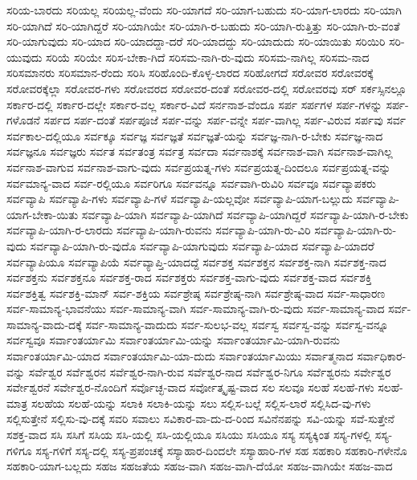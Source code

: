 {ಸರಿಯ-ಬಾರದು
ಸರಿಯಲ್ಲ
ಸರಿಯಲ್ಲ-ವೆಂದು
ಸರಿ-ಯಾಗದೆ
ಸರಿ-ಯಾಗ-ಬಹುದು
ಸರಿ-ಯಾಗ-ಲಾರದು
ಸರಿ-ಯಾಗಿ
ಸರಿ-ಯಾಗಿದೆ
ಸರಿ-ಯಾಗಿದ್ದರೆ
ಸರಿ-ಯಾಗಿಯೇ
ಸರಿ-ಯಾಗಿ-ರ-ಬಹುದು
ಸರಿ-ಯಾಗಿ-ರುತ್ತಿತ್ತು
ಸರಿ-ಯಾಗಿ-ರು-ವಂತೆ
ಸರಿ-ಯಾಗುವುದು
ಸರಿ-ಯಾದ
ಸರಿ-ಯಾದದ್ದಾ-ದರೆ
ಸರಿ-ಯಾದದ್ದು
ಸರಿ-ಯಾದುದು
ಸರಿ-ಯಾಯಿತು
ಸರಿಯಿರಿ
ಸರಿ-ಯುವುದು
ಸರಿಯೆ
ಸರಿಯೇ
ಸರಿಸ-ಬೇಕಾ-ಗಿದೆ
ಸರಿಸಮ-ನಾಗಿ-ರು-ವುದು
ಸರಿಸಮ-ನಾಗಿಲ್ಲ
ಸರಿಸಮ-ನಾದ
ಸರಿಸಮಾನರು
ಸರಿಸಮಾನ-ರೆಂದು
ಸರಿಸಿ
ಸರಿಹೊಂದಿ-ಕೊಳ್ಳ-ಲಾರದ
ಸರಿಹೋಗದೆ
ಸರೋವರ
ಸರೋವರಕ್ಕೆ
ಸರೋವರಕ್ಕೆಲ್ಲಾ
ಸರೋವರ-ಗಳು
ಸರೋವರದ
ಸರೋವರ-ದಂತೆ
ಸರೋವರ-ದಲ್ಲಿ
ಸರೋವರವು
ಸರ್
ಸರ್ಕಸ್ಸಿನಲ್ಲೂ
ಸರ್ಕಾರ-ದಲ್ಲಿ
ಸರ್ಕಾರ-ದಲ್ಲೇ
ಸರ್ಕಾರ-ವಲ್ಲ
ಸರ್ಕಾರ-ವಿದೆ
ಸರ್ನನಾಶ-ವೆಂದೂ
ಸರ್ಪ
ಸರ್ಪಗಳ
ಸರ್ಪ-ಗಳನ್ನು
ಸರ್ಪ-ಗಳೊಡನೆ
ಸರ್ಪದ
ಸರ್ಪ-ದಂತೆ
ಸರ್ಪಪೂಜೆ
ಸರ್ಪ-ವನ್ನು
ಸರ್ಪ-ವನ್ನೇ
ಸರ್ಪ-ವಾಗಿಲ್ಲ
ಸರ್ಪ-ವಿರುವ
ಸರ್ಪವು
ಸರ್ವ
ಸರ್ವಕಾಲ-ದಲ್ಲಿಯೂ
ಸರ್ವಕ್ಕೂ
ಸರ್ವಜ್ಞ
ಸರ್ವಜ್ಞತೆ
ಸರ್ವಜ್ಞತೆ-ಯನ್ನು
ಸರ್ವಜ್ಞ-ನಾಗಿ-ರ-ಬೇಕು
ಸರ್ವಜ್ಞ-ನಾದ
ಸರ್ವಜ್ಞನೂ
ಸರ್ವಜ್ಞರು
ಸರ್ವತ
ಸರ್ವತಂತ್ರ
ಸರ್ವತ್ರ
ಸರ್ವದಾ
ಸರ್ವನಾಶಕ್ಕೆ
ಸರ್ವನಾಶ-ವಾಗಿ
ಸರ್ವನಾಶ-ವಾಗಿಲ್ಲ
ಸರ್ವನಾಶ-ವಾಗುವ
ಸರ್ವನಾಶ-ವಾಗು-ವುದು
ಸರ್ವಪ್ರಯತ್ನ-ಗಳು
ಸರ್ವಪ್ರಯತ್ನ-ದಿಂದಲೂ
ಸರ್ವಪ್ರಯತ್ನ-ವನ್ನು
ಸರ್ವಮಾನ್ಯ-ವಾದ
ಸರ್ವ-ರಲ್ಲಿಯೂ
ಸರ್ವರಿಗೂ
ಸರ್ವವನ್ನೂ
ಸರ್ವವಾಗಿ-ರುವಿರಿ
ಸರ್ವವೂ
ಸರ್ವವ್ಯಾಪಕರು
ಸರ್ವವ್ಯಾಪಿ
ಸರ್ವವ್ಯಾಪಿ-ಗಳು
ಸರ್ವವ್ಯಾಪಿ-ಗಳೆ
ಸರ್ವವ್ಯಾಪಿ-ಯಲ್ಲವೋ
ಸರ್ವವ್ಯಾಪಿ-ಯಾಗ-ಬಲ್ಲುದು
ಸರ್ವವ್ಯಾಪಿ-ಯಾಗ-ಬೇಕಾ-ಯಿತು
ಸರ್ವವ್ಯಾಪಿ-ಯಾಗಿ
ಸರ್ವವ್ಯಾಪಿ-ಯಾಗಿದೆ
ಸರ್ವವ್ಯಾಪಿ-ಯಾಗಿದ್ದರೆ
ಸರ್ವವ್ಯಾಪಿ-ಯಾಗಿ-ರ-ಬೇಕು
ಸರ್ವವ್ಯಾಪಿ-ಯಾಗಿ-ರ-ಲಾರದು
ಸರ್ವವ್ಯಾಪಿ-ಯಾಗಿ-ರುವನು
ಸರ್ವವ್ಯಾಪಿ-ಯಾಗಿ-ರು-ವಿರಿ
ಸರ್ವವ್ಯಾಪಿ-ಯಾಗಿ-ರು-ವುದು
ಸರ್ವವ್ಯಾಪಿ-ಯಾಗಿ-ರು-ವುದೊ
ಸರ್ವವ್ಯಾಪಿ-ಯಾಗುವುದು
ಸರ್ವವ್ಯಾಪಿ-ಯಾದ
ಸರ್ವವ್ಯಾಪಿ-ಯಾದರೆ
ಸರ್ವವ್ಯಾಪಿಯೂ
ಸರ್ವವ್ಯಾಪಿಯೆ
ಸರ್ವವ್ಯಾಪ್ತಿ-ಯಾದದ್ದೆ
ಸರ್ವಶಕ್ತ
ಸರ್ವಶಕ್ತನ
ಸರ್ವಶಕ್ತ-ನಾಗಿ
ಸರ್ವಶಕ್ತ-ನಾದ
ಸರ್ವಶಕ್ತನು
ಸರ್ವಶಕ್ತನೂ
ಸರ್ವಶಕ್ತ-ರಾದ
ಸರ್ವಶಕ್ತರು
ಸರ್ವಶಕ್ತ-ವಾಗು-ವುದು
ಸರ್ವಶಕ್ತ-ವಾದ
ಸರ್ವಶಕ್ತಿ
ಸರ್ವಶಕ್ತಿತ್ವ
ಸರ್ವಶಕ್ತಿ-ಮಾನ್
ಸರ್ವ-ಶಕ್ತಿಯ
ಸರ್ವಶ್ರೇಷ್ಠ
ಸರ್ವಶ್ರೇಷ್ಠ-ನಾಗಿ
ಸರ್ವಶ್ರೇಷ್ಠ-ವಾದ
ಸರ್ವ-ಸಾಧಾರಣ
ಸರ್ವ-ಸಾಮಾನ್ಯ-ಭಾವನೆಯು
ಸರ್ವ-ಸಾಮಾನ್ಯ-ವಾಗಿ
ಸರ್ವ-ಸಾಮಾನ್ಯ-ವಾಗಿ-ರು-ವುದು
ಸರ್ವ-ಸಾಮಾನ್ಯ-ವಾದ
ಸರ್ವ-ಸಾಮಾನ್ಯ-ವಾದು-ದಕ್ಕೆ
ಸರ್ವ-ಸಾಮಾನ್ಯ-ವಾದುದು
ಸರ್ವ-ಸುಲಭ-ವಲ್ಲ
ಸರ್ವಸ್ವ
ಸರ್ವಸ್ವ-ವನ್ನು
ಸರ್ವಸ್ವ-ವನ್ನೂ
ಸರ್ವಸ್ವವೂ
ಸರ್ವಾಂತರ್ಯಾಮಿ
ಸರ್ವಾಂತರ್ಯಾಮಿ-ಯನ್ನು
ಸರ್ವಾಂತರ್ಯಾಮಿ-ಯಾಗಿ-ರುವನು
ಸರ್ವಾಂತರ್ಯಾಮಿ-ಯಾದ
ಸರ್ವಾಂತರ್ಯಾಮಿ-ಯಾ-ದುದು
ಸರ್ವಾಂತರ್ಯಾಮಿಯು
ಸರ್ವಾತ್ಮನಾದ
ಸರ್ವಾಧಿಕಾರ-ವನ್ನು
ಸರ್ವೆಶ್ವರ
ಸರ್ವೆಶ್ವರನ
ಸರ್ವೆಶ್ವರ-ನಾಗಿ-ರುವ
ಸರ್ವೆಶ್ವರ-ನಾದ
ಸರ್ವೆಶ್ವರ-ನಿಗೂ
ಸರ್ವೆಶ್ವರನು
ಸರ್ವೇಶ್ವರ
ಸರ್ವೇಶ್ವರನೆ
ಸರ್ವೇಶ್ವರ-ನೊಂದಿಗೆ
ಸರ್ವೊಚ್ಛ-ವಾದ
ಸರ್ವೋತ್ಕೃಷ್ಟ-ವಾದ
ಸಲ
ಸಲವೂ
ಸಲಹೆ
ಸಲಹೆ-ಗಳು
ಸಲಹೆ-ಮಾತ್ರ
ಸಲಹೆಯ
ಸಲಹೆ-ಯನ್ನು
ಸಲಾಕಿ
ಸಲಾಕಿ-ಯನ್ನು
ಸಲು
ಸಲ್ಲಿಸ-ಬಲ್ಲೆ
ಸಲ್ಲಿಸ-ಲಾರೆ
ಸಲ್ಲಿಸಿದ-ವು-ಗಳು
ಸಲ್ಲಿಸುತ್ತೇನೆ
ಸಲ್ಲಿಸು-ವು-ದಕ್ಕೆ
ಸವರಿ
ಸವಾಲು
ಸವಿಕಾರ-ವಾ-ದು-ದ-ರಿಂದ
ಸವಿನೆನಪನ್ನು
ಸವಿ-ಯನ್ನು
ಸವೆ-ಸುತ್ತೇನೆ
ಸಶಕ್ತ-ವಾದ
ಸಸಿ
ಸಸಿಗೆ
ಸಸಿಯ
ಸಸಿ-ಯಲ್ಲಿ
ಸಸಿ-ಯಲ್ಲಿಯೂ
ಸಸಿಯು
ಸಸಿಯೂ
ಸಸ್ಯ
ಸಸ್ಯಕ್ಕಿಂತ
ಸಸ್ಯ-ಗಳಲ್ಲಿ
ಸಸ್ಯ-ಗಳಿಗೂ
ಸಸ್ಯ-ಗಳಿಗೆ
ಸಸ್ಯ-ದಲ್ಲಿ
ಸಸ್ಯ-ಪ್ರಪಂಚಕ್ಕೆ
ಸಸ್ಯಾಹಾರ-ದಿಂದಲೇ
ಸಸ್ಯಾಹಾರಿ-ಗಳ
ಸಹ
ಸಹಕಾರಿ
ಸಹಕಾರಿ-ಗಳೇನೊ
ಸಹಕಾರಿ-ಯಾಗ-ಬಲ್ಲದು
ಸಹಜ
ಸಹಜತೆಯ
ಸಹಜ-ವಾಗಿ
ಸಹಜ-ವಾಗಿ-ದೆಯೋ
ಸಹಜ-ವಾಗಿಯೇ
ಸಹಜ-ವಾದ
}
